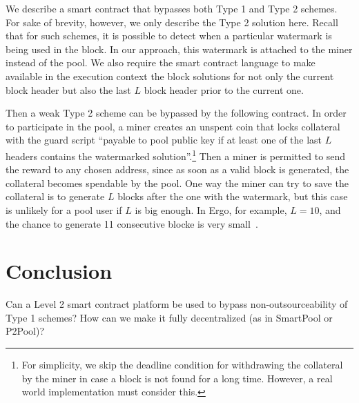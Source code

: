 \documentclass[11pt]{article}
\begin{document}
We describe a smart contract that bypasses both Type 1 and Type 2 schemes. For sake of brevity, however, we only describe the Type 2 solution here. Recall that for such schemes, it is possible to detect when a particular watermark is being used in the block. In our approach, this watermark is attached to the miner instead of the pool. 
We also require the smart contract language to make available in the execution context the block solutions for not only the current block header but also the last $L$ block header prior to the current one. 

Then a weak Type 2 scheme can be bypassed by the following contract. In order to participate in the pool, a miner creates an unspent coin that locks collateral with the guard script ``payable to pool public key if at least one of the last $L$ headers contains the watermarked solution''.\footnote{For simplicity, we skip the deadline condition for withdrawing the collateral by the miner in case a block is not found for a long time. However, a real world implementation must consider this.}
Then a miner is permitted to send the reward to any chosen address, since as soon as a valid block is generated, the collateral becomes spendable by the pool. One way the miner can try to save the collateral is to generate $L$ blocks after the one with the watermark, but this case is unlikely for a pool user if $L$ is big enough. In Ergo, for example, $L = 10$, and the chance to generate 11 consecutive blocke is very small~\cite{Nak08}. 




\section{Conclusion}

Can a Level 2 smart contract platform be used to bypass non-outsourceability of Type 1 schemes?
How can we make it fully decentralized (as in SmartPool or P2Pool)?



\appendix
\end{document}
